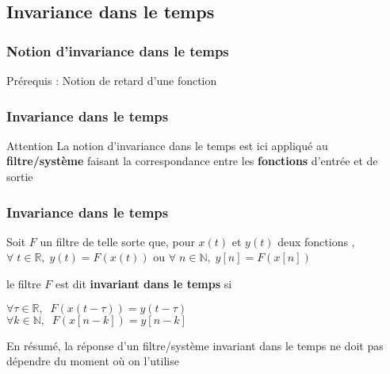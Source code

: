 \documentclass{beamer}
\begin{document}
\subsection{Invariance dans le temps}
\begin{frame}
\frametitle{Notion d'invariance dans le temps}
Prérequis : Notion de retard d'une fonction \\


\end{frame}

\begin{frame}
\frametitle{Invariance dans le temps}

\begin{block}{Attention}
La notion d'invariance dans le temps est ici appliqué au \textbf{filtre/système} faisant la correspondance entre les \textbf{fonctions} d'entrée et de sortie 
\end{block}
\end{frame}


\begin{frame}
\frametitle{Invariance dans le temps}
Soit $F$ un filtre de telle sorte que, pour $x(t)$ et $y(t)$ deux fonctions , $ \forall \; t \in \mathbb{R}, \; y(t) = F(x(t))$ ou $ \forall \; n \in \mathbb{N}, \; y[n] = F(x[n])$ \\

{
\vspace{1cm} 
le filtre $F$  est dit \textbf{invariant dans le temps} si \\
\vspace{1cm}
\begin{center}
$\forall \tau \in \mathbb{R}, \;\; F(x(t-\tau)) = y(t-\tau)$\\
\vspace{0.7 cm}
$\forall k \in \mathbb{N}, \;\; F(x[n-k]) = y[n-k]$\\
\end{center}
}

{ 
\begin{block}{}
	En résumé, la réponse d'un filtre/système invariant dans le temps ne doit pas dépendre du moment où on l'utilise
\end{block} 
}

\end{frame}
\end{document}
